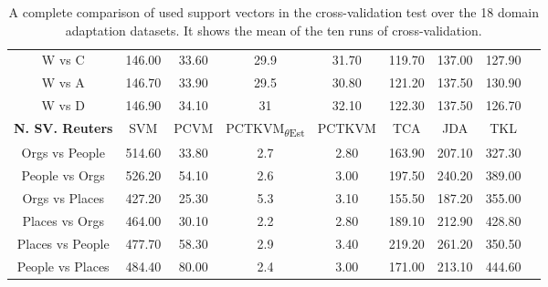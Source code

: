 \begin{table}[]
{\begin{tabular}{@{}ccccccccc@{}}
			W vs C                           & 146.00 & 33.60  & 29.9                               & 31.70  & 119.70 & 137.00 & 127.90 \\
			W vs A                           & 146.70 & 33.90  & 29.5                               & 30.80  & 121.20 & 137.50 & 130.90 \\
			W vs D                           & 146.90 & 34.10  & 31                               & 32.10  & 122.30 & 137.50 & 126.70 \\ \midrule
			\textbf{N. SV. Reuters}        & SVM    & PCVM   & PCTKVM\textsubscript{$\theta$Est} & PCTKVM & TCA    & JDA    & TKL    \\ \midrule
			Orgs vs People                   & 514.60 & 33.80  & 2.7                               & 2.80   & 163.90 & 207.10 & 327.30 \\
			People vs Orgs                   & 526.20 & 54.10  & 2.6                               & 3.00   & 197.50 & 240.20 & 389.00 \\
			Orgs vs Places                   & 427.20 & 25.30  & 5.3                               & 3.10   & 155.50 & 187.20 & 355.00 \\
			Places vs Orgs                   & 464.00 & 30.10  & 2.2                               & 2.80   & 189.10 & 212.90 & 428.80 \\
			Places vs People                 & 477.70 & 58.30  & 2.9                               & 3.40   & 219.20 & 261.20 & 350.50 \\
			People vs Places                 & 484.40 & 80.00  & 2.4                               & 3.00   & 171.00 & 213.10 & 444.60 \\ \bottomrule
	\end{tabular}}
	\caption[Number of used support vectors from cross-validation]{A complete comparison of used support vectors in the cross-validation test over the 18 domain adaptation datasets. It shows the mean of the ten runs of cross-validation.\label{BTableFTNev}}
\end{table}
